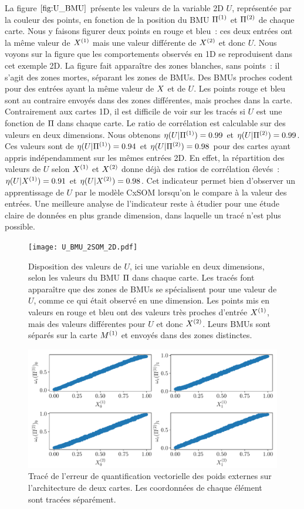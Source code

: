 \documentclass[../main]{subfiles}
\begin{document}
La figure $\ref{fig:U_BMU}$ présente les valeurs de la variable 2D $U$, représentée par la couleur des points, en fonction de la position du BMU $\Pi^{({1})}$ et $\Pi^{({2})}$ de chaque carte. Nous y faisons figurer deux points en rouge et bleu~: ces deux entrées ont la même valeur de $X^{({1})}$ mais une valeur différente de $X^{({2})}$ et donc $U$.
Nous voyons sur la figure que les comportements observés en 1D se reproduisent dans cet exemple 2D. La figure fait apparaître des zones blanches, sans points~: il s'agit des zones mortes, séparant les zones de BMUs. Des BMUs proches codent pour des entrées ayant la même valeur de $X$ et de $U$. Les points rouge et bleu sont au contraire envoyés dans des zones différentes, mais proches dans la carte.
Contrairement aux cartes 1D, il est difficile de voir sur les tracés si $U$ est une fonction de $\Pi$ dans chaque carte. Le ratio de corrélation est calculable sur des valeurs en deux dimensions.
Nous obtenons $\eta(U|\Pi^{({1})}) = 0.99 $ et $\eta(U|\Pi^{({2})}) = 0.99 $.
Ces valeurs sont de $\eta(U|\Pi^{({1})}) = 0.94 $ et $\eta(U|\Pi^{({2})}) = 0.98$ pour des cartes ayant appris indépendamment sur les mêmes entrées 2D.
En effet, la répartition des valeurs de $U$ selon $X^{({1})}$ et $X^{({2})}$ donne déjà des ratios de corrélation élevés~:
$\eta(U|X^{({1})}) = 0.91$ et $\eta(U|X^{({2})}) = 0.98$. 
Cet indicateur permet bien d'observer un apprentissage de $U$ par le modèle CxSOM lorsqu'on le compare à la valeur des entrées. Une meilleure analyse de l'indicateur reste à étudier pour une étude claire de données en plus grande dimension, dans laquelle un tracé n'est plus possible.

\begin{figure}
	\texttt{[image: U\_BMU\_2SOM\_2D.pdf]}
	\caption{Disposition des valeurs de $U$, ici une variable en deux dimensions, selon les valeurs du BMU $\Pi$ dans chaque carte. Les tracés font apparaître que des zones de BMUs se spécialisent pour une valeur de $U$, comme ce qui était observé en une dimension. Les points mis en valeurs en rouge et bleu ont des valeurs très proches d'entrée $X^{({1})}$, mais des valeurs différentes pour $U$ et donc $X^{({2})}$. Leurs BMUs sont séparés sur la carte $M^{({1})}$ et envoyés dans des zones distinctes.
	\label{fig:U_BMU}}
\end{figure}

\begin{figure}
	\includegraphics[width=\textwidth]{error-2SOM.pdf}
	\caption{Tracé de l'erreur de quantification vectorielle des poids externes sur l'architecture de deux cartes. Les coordonnées de chaque élément sont tracées séparément. \label{fig:qv2D}}
\end{figure}
\end{document}
